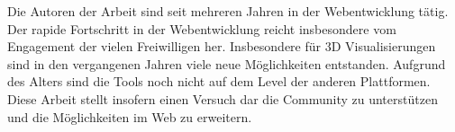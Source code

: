 Die Autoren der Arbeit sind seit mehreren Jahren in der Webentwicklung tätig. Der rapide Fortschritt in der Webentwicklung reicht insbesondere vom Engagement der vielen Freiwilligen her.
Insbesondere für 3D Visualisierungen sind in den vergangenen Jahren viele neue Möglichkeiten entstanden. Aufgrund des Alters sind die Tools noch nicht auf dem Level der anderen Plattformen. Diese Arbeit stellt insofern einen Versuch dar die Community zu unterstützen und die Möglichkeiten im Web zu erweitern.
